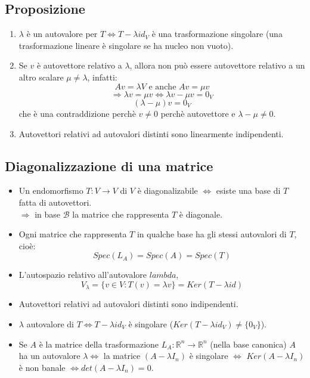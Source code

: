 \subsection{Proposizione}
\begin{enumerate}
\item $\lambda$ è un autovalore per $T\Leftrightarrow T-\lambda id_V$ è una trasformazione singolare (una trasformazione lineare è singolare se ha nucleo non vuoto).
\item Se $v$ è autovettore relativo a $\lambda$, allora non può essere autovettore relativo a un altro scalare $\mu\neq\lambda $, infatti:
  \[Av=\lambda V\text{ e anche } Av=\mu v\]
  \[\Rightarrow \lambda v=\mu v \Leftrightarrow \lambda v-\mu v=0_V\]
  \[(\lambda -\mu)v=0_V\]
  che è una contraddizione perchè $v\neq 0$ perchè autovettore e $\lambda-\mu\neq 0$.

  \item Autovettori relativi ad autovalori distinti sono linearmente indipendenti.

\end{enumerate}

\subsection{Diagonalizzazione di una matrice}
\begin{itemize}
\item Un endomorfismo $T:V\rightarrow V$ di $V$ è diagonalizabile $\Leftrightarrow$ esiste una base di $T$ fatta di autovettori.
  \\$\Rightarrow$ in base $\mathcal{B}$ la matrice che rappresenta $T$ è diagonale.

\item Ogni matrice che rappresenta $T$ in qualche base ha gli stessi autovalori di $T$, cioè:
  \[Spec(L_A)=Spec(A)=Spec(T)\]

\item L'autospazio relativo all'autovalore $lambda $,
  \[V_\lambda=\{v\in V: T(v)=\lambda v\}=Ker(T-\lambda id)\]

\item Autovettori relativi ad autovalori distinti sono indipendenti.

\item $\lambda$ autovalore di $T\Leftrightarrow T-\lambda id_V$ è singolare ($Ker(T-\lambda id_V)\neq\{0_V\}$).

\item Se $A$ è la matrice della trasformazione $L_A:\mathbb{R}^n\rightarrow\mathbb{R}^n$ (nella base canonica) $A$ ha un autovalore $\lambda\Leftrightarrow$ la matrice $(A-\lambda I_n)$ è singolare $\Leftrightarrow$ $Ker(A-\lambda I_n)$ è non banale $\Leftrightarrow det(A-\lambda I_n)=0$.
  
\end{itemize}

